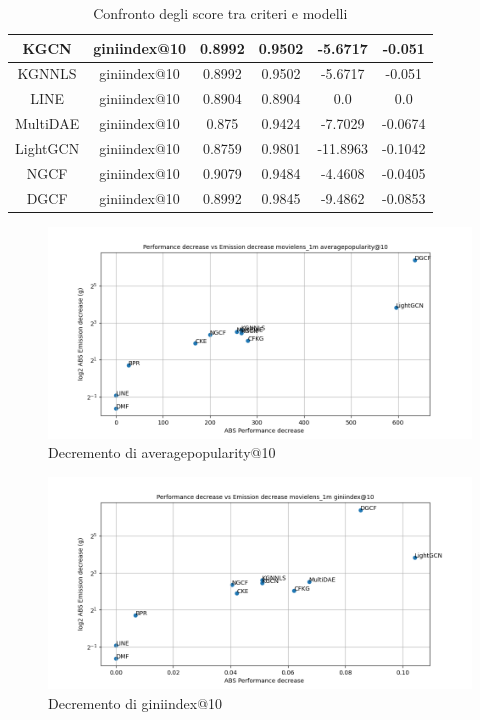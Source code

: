 \begin{table}[H]
{\begin{tabular}{|c|c|c|c|c|c|}
            \hline
            KGCN & giniindex@10 & 0.8992 & 0.9502 & -5.6717 & -0.051\\
            \hline
            KGNNLS & giniindex@10 & 0.8992 & 0.9502 & -5.6717 & -0.051\\
            \hline
            LINE & giniindex@10 & 0.8904 & 0.8904 & 0.0 & 0.0\\
            \hline
            MultiDAE & giniindex@10 & 0.875 & 0.9424 & -7.7029 & -0.0674\\
            \hline
            LightGCN & giniindex@10 & 0.8759 & 0.9801 & -11.8963 & -0.1042\\
            \hline
            NGCF & giniindex@10 & 0.9079 & 0.9484 & -4.4608 & -0.0405\\
            \hline
            DGCF & giniindex@10 & 0.8992 & 0.9845 & -9.4862 & -0.0853\\
            \hline
        \end{tabular}
    }
    \caption{Confronto degli score tra criteri e modelli}
\end{table}

\begin{figure}[H]
    \centering
     \includegraphics[width=\textwidth]{images/decrement_averagepopularity@10_movielens_1m.png}
    \caption{Decremento di averagepopularity@10}
\end{figure}

\begin{figure}[H]
    \centering
     \includegraphics[width=\textwidth]{images/decrement_giniindex@10_movielens_1m.png}
    \caption{Decremento di giniindex@10}
\end{figure}

